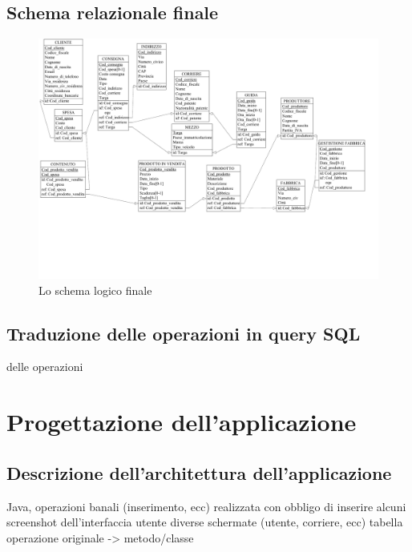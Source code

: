 \documentclass[a4paper,12pt]{report}
\begin{document}
\section{Schema relazionale finale}
\begin{figure}[H]
	\centering{}
	\includegraphics[width=\textwidth]{img/SchemaLogico-fin.pdf}
	\caption{Lo schema logico finale}
\end{figure}
\section{Traduzione delle operazioni in query SQL}
delle operazioni

\chapter{Progettazione dell'applicazione}
\section{Descrizione dell'architettura dell'applicazione}
Java, operazioni banali (inserimento, ecc)
realizzata con obbligo di inserire alcuni screenshot dell'interfaccia utente
diverse schermate (utente, corriere, ecc)
tabella operazione originale -> metodo/classe
\end{document}

